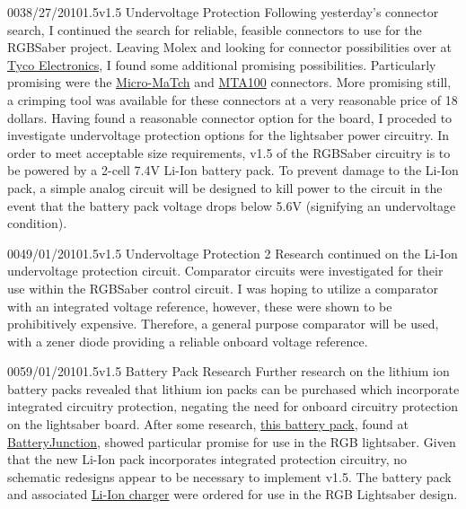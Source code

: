 \documentclass[12pt,letterpaper,onecolumn]{article}
\begin{document}
\begin{nbentry}{003}{8/27/2010}{1.5}{v1.5 Undervoltage Protection}
	Following yesterday's connector search, I continued the search for reliable, feasible connectors to use for the RGBSaber project. Leaving Molex and looking for connector possibilities over at \href{http://tycoelectronics.com}{Tyco Electronics}, I found some additional promising possibilities. Particularly promising were the \href{http://www.tycoelectronics.com/catalog/feat/en/c/11398?BML=10576,17560,23645,17587}{Micro-MaTch} and \href{http://www.tycoelectronics.com/catalog/feat/en/s/23478?BML=10576,17560,23645,17587}{MTA100} connectors. More promising still, a crimping tool was available for these connectors at a very reasonable price of 18 dollars.
	Having found a reasonable connector option for the board, I proceded to investigate undervoltage protection options for the lightsaber power circuitry. In order to meet acceptable size requirements, v1.5 of the RGBSaber circuitry is to be powered by a 2-cell 7.4V Li-Ion battery pack. To prevent damage to the Li-Ion pack, a simple analog circuit will be designed to kill power to the circuit in the event that the battery pack voltage drops below 5.6V (signifying an undervoltage condition).
\end{nbentry}

\begin{nbentry}{004}{9/01/2010}{1.5}{v1.5 Undervoltage Protection 2}
	Research continued on the Li-Ion undervoltage protection circuit. Comparator circuits were investigated for their use within the RGBSaber control circuit. I was hoping to utilize a comparator with an integrated voltage reference, however, these were shown to be prohibitively expensive. Therefore, a general purpose comparator will be used, with a zener diode providing a reliable onboard voltage reference.
\end{nbentry}

\begin{nbentry}{005}{9/01/2010}{1.5}{v1.5 Battery Pack Research}
	Further research on the lithium ion battery packs revealed that lithium ion packs can be purchased which incorporate integrated circuitry protection, negating the need for onboard circuitry protection on the lightsaber board. After some research, \href{http://www.batteryjunction.com/tenergy-18650-2200-pk.html}{this battery pack}, found at \href{http://www.batteryjunction.com/}{BatteryJunction}, showed particular promise for use in the RGB lightsaber.
	Given that the new Li-Ion pack incorporates integrated protection circuitry, no schematic redesigns appear to be necessary to implement v1.5. The battery pack and associated \href{http://www.batteryjunction.com/unsmchforlib.html}{Li-Ion charger} were ordered for use in the RGB Lightsaber design.
\end{nbentry}
\end{document}
